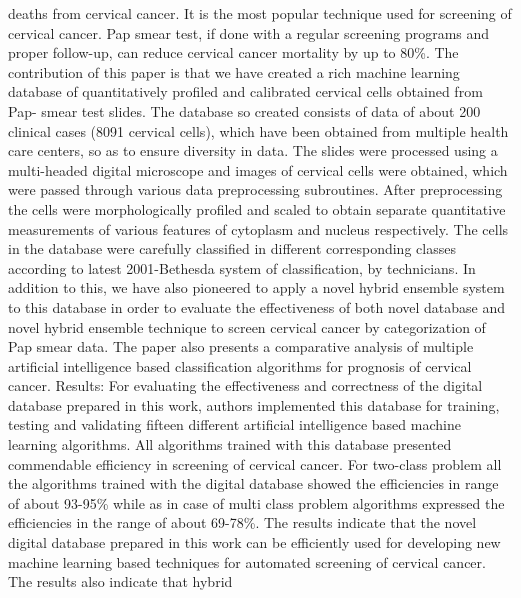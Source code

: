 \begin{enumerate}[label=\textbf{\arabic*}]
\begin{itemize}
{        deaths from cervical cancer. It is the most popular technique used for
        screening of cervical cancer. Pap smear test, if done with a regular
        screening programs and proper follow-up, can reduce cervical cancer
        mortality by up to 80\%. The contribution of this paper is that we have
        created a rich machine learning database of quantitatively profiled and
        calibrated cervical cells obtained from Pap- smear test slides. The
        database so created consists of data of about 200 clinical cases (8091
        cervical cells), which have been obtained from multiple health care
        centers, so as to ensure diversity in data. The slides were processed
        using a multi-headed digital microscope and images of cervical cells
        were obtained, which were passed through various data preprocessing
        subroutines. After preprocessing the cells were morphologically profiled
        and scaled to obtain separate quantitative measurements of various
        features of cytoplasm and nucleus respectively. The cells in the
        database were carefully classified in different corresponding classes
        according to latest 2001-Bethesda system of classification, by
        technicians. In addition to this, we have also pioneered to apply a
        novel hybrid ensemble system to this database in order to evaluate the
        effectiveness of both novel database and novel hybrid ensemble technique
        to screen cervical cancer by categorization of Pap smear data. The paper
        also presents a comparative analysis of multiple artificial intelligence
        based classification algorithms for prognosis of cervical cancer.
        Results: For evaluating the effectiveness and correctness of the digital
        database prepared in this work, authors implemented this database for
        training, testing and validating fifteen different artificial
        intelligence based machine learning algorithms. All algorithms trained
        with this database presented commendable efficiency in screening of
        cervical cancer. For two-class problem all the algorithms trained with
        the digital database showed the efficiencies in range of about 93-95\%
        while as in case of multi class problem algorithms expressed the
        efficiencies in the range of about 69-78\%. The results indicate that
        the novel digital database prepared in this work can be efficiently used
        for developing new machine learning based techniques for automated
        screening of cervical cancer. The results also indicate that hybrid
}
\end{itemize}
\end{enumerate}
